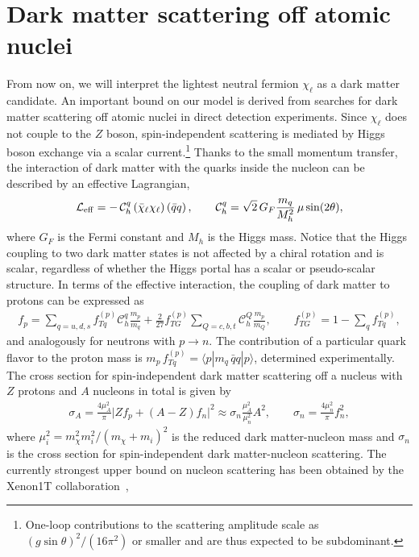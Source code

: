 \documentclass[nofootinbib,prd,aps,superscriptaddress,preprintnumbers]{revtex4}
\def\beq{\begin{equation}}
\def\eeq{\end{equation}}
\begin{document}
\section{Dark matter scattering off atomic nuclei}\label{sec:scattering}
%
\noindent
From now on, we will interpret the lightest neutral fermion $\chi_\ell$ as a dark matter candidate. An important bound on our model is derived from searches for dark matter scattering off atomic nuclei in direct detection experiments. Since $\chi_\ell$ does not couple to the $Z$ boson, spin-independent scattering is mediated by Higgs boson exchange via a scalar current.\footnote{One-loop contributions to the scattering amplitude scale as $(g\sin\theta)^2/(16\pi^2)$ or smaller and are thus expected to be subdominant.} Thanks to the small momentum transfer, the interaction of dark matter with the quarks inside the nucleon can be described by an effective Lagrangian,
\beq\label{eq:dd-eff}
\mathcal{L}_{\rm eff} = -\,\mathcal{C}_h^q\,(\bar{\chi}_\ell\chi_\ell)\,(\bar{q}q)\,,\qquad \mathcal{C}_h^q = \sqrt{2}\,G_F \frac{m_q}{M_h^2}\,\mu\sin(2\theta),
\eeq
where $G_F$ is the Fermi constant and $M_h$ is the Higgs mass. Notice that the Higgs coupling to two dark matter states is not affected by a chiral rotation and is scalar, regardless of whether the Higgs portal has a scalar or pseudo-scalar structure. In terms of the effective interaction, the coupling of dark matter to protons can be expressed as
\begin{align}
f_p =\sum_{q=u,d,s} f_{Tq}^{(p)} \mathcal{C}_h^q \frac{m_{p}}{m_q} + \frac{2}{27}f_{TG}^{(p)}\sum_{Q=c,b,t} \mathcal{C}_h^Q\frac{m_{p}}{m_Q},\qquad f_{TG}^{(p)} = 1-\sum_{q} f_{Tq}^{(p)},
\end{align}
and analogously for neutrons with $p\to n$. The contribution of a particular quark flavor to the proton mass is $m_p\,f_{Tq}^{(p)} = \langle p|m_q\,\bar q q|p\rangle$, determined experimentally. The cross section for spin-independent dark matter scattering off a nucleus with $Z$ protons and $A$ nucleons in total is given by
\begin{align}
\sigma_A = \frac{4\mu_A^2}{\pi}\big\vert Z f_p+(A-Z) f_n\big\vert ^2 \approx \sigma_n\frac{\mu_A^2}{\mu_n^2}A^2,\qquad \sigma_n=\frac{4\mu_n^2}{\pi}f_n^2,
\end{align}
where $\mu_i^2= m_\chi^2 m_i^2/(m_\chi+m_i)^2$ is the reduced dark matter-nucleon mass and $\sigma_n$ is the cross section for spin-independent dark matter-nucleon scattering. The currently strongest upper bound on nucleon scattering has been obtained by the Xenon1T collaboration~\cite{Aprile:2018dbl},
\end{document}
